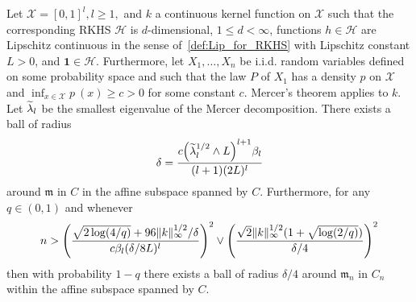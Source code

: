 \documentclass[AHL,Unicode,longabstracts,published]{cedram}
\theoremstyle{remark}
\newcommand{\X}{\mathcal{X}}
\newcommand{\cH}{\mathcal{H}}
\newcommand{\mean}{\mathfrak{m}}
\let\oldtilde\tilde
\renewcommand*{\tilde}[1]{\mathchoice{\widetilde{#1}}{\widetilde{#1}}{\oldtilde{#1}}{\oldtilde{#1}}}
\let\originalleft\left
\let\originalright\right
\renewcommand{\left}{\mathopen{}\mathclose\bgroup\originalleft}
\renewcommand{\right}{\aftergroup\egroup\originalright}
\begin{document}
\begin{theo}\label{thm:ball_in_empirical}
Let $\X = [0,1]^l, l \geq 1,$ and $k$ a continuous kernel function on $\X$ such that the corresponding RKHS $\cH$ is $d$-dimensional, $1 \leq d < \infty$, functions $h \in \cH$ are Lipschitz continuous in the sense of~\eqref{def:Lip_for_RKHS} with Lipschitz constant $L>0$, and $\bm 1 \in \cH$. Furthermore, let $X_1,\dots, X_n$ be i.i.d. random variables defined on some probability space and such that the law $P$ of $X_1$ has a density $p$ on $\X$ and $\inf_{x\in\X} p~(x) \geq c >0$ for some constant $c$. Mercer's theorem applies to $k$. Let $\tilde \lambda_l$ be the smallest eigenvalue of the Mercer decomposition. There exists a ball of radius
\[
\delta = \frac{c\left(\tilde \lambda_l^{1/2} \wedge L\right)^{l+1}\beta_l}{(l+1) (2L)^l}
\]
around $\mean$ in $C$ in the affine subspace spanned by $C$. Furthermore, for any $q \in (0,1)$ and whenever
\[
n > \left(\frac{\sqrt{2\log(4/q)} + 96 \|k\|_\infty^{1/2}/\delta}{c\beta_l(\delta/8L)^l}\right)^{2} \vee
\left(\frac{\sqrt{2} \|k\|^{1/2}_\infty (1 + \sqrt{\log(2/q)})}{\delta/4}\right)^{2}
\]
then with probability $1-q$ there exists a ball of radius $\delta/4$ around $\mean_n$ in $C_n$ within the affine subspace spanned by $C$.
\end{theo}
\end{document}
